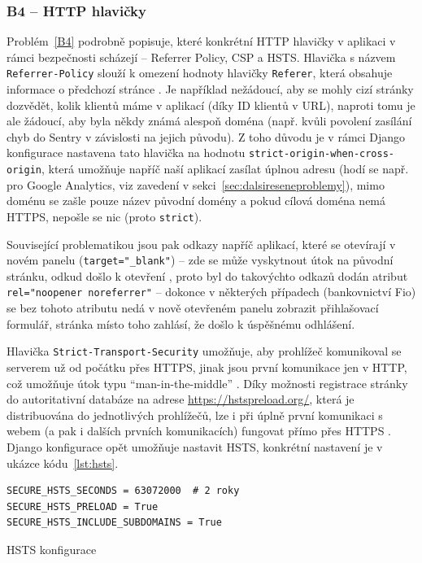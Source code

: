 \subsubsection{B4 -- HTTP hlavičky}

Problém~\ref{B4} podrobně popisuje, které konkrétní HTTP hlavičky v aplikaci v rámci bezpečnosti scházejí -- Referrer Policy, CSP a HSTS. Hlavička s názvem \verb|Referrer-Policy| slouží k omezení hodnoty hlavičky \verb|Referer|, která obsahuje informace o předchozí stránce \cite{securityheaders-referer}. Je například nežádoucí, aby se mohly cizí stránky dozvědět, kolik klientů máme v aplikací (díky ID klientů v URL), naproti tomu je ale žádoucí, aby byla někdy známá alespoň doména (např. kvůli povolení zasílání chyb do Sentry v závislosti na jejich původu). Z toho důvodu je v rámci Django konfigurace nastavena tato hlavička na hodnotu \verb|strict-origin-when-cross-origin|, která umožňuje napříč naší aplikací zasílat úplnou adresu (hodí se např. pro Google Analytics, viz zavedení v sekci~\ref{sec:dalsireseneproblemy}), mimo doménu se zašle pouze název původní domény a pokud cílová doména nemá HTTPS, nepošle se nic (proto \verb|strict|). 

Související problematikou jsou pak odkazy napříč aplikací, které se otevírají v novém panelu (\verb|target="_blank"|) -- zde se může vyskytnout útok na původní stránku, odkud došlo k otevření \cite{noopener}, proto byl do takovýchto odkazů dodán atribut \verb|rel="noopener noreferrer"| -- dokonce v některých případech (bankovnictví Fio) se bez tohoto atributu nedá v nově otevřeném panelu zobrazit přihlašovací formulář, stránka místo toho zahlásí, že došlo k úspěšnému odhlášení.

Hlavička \verb|Strict-Transport-Security| umožňuje, aby prohlížeč komunikoval se serverem už od počátku přes HTTPS, jinak jsou první komunikace jen v HTTP, což umožňuje útok typu \enquote{man-in-the-middle} \cite{securityheaders-hsts}. Díky možnosti registrace stránky do autoritativní databáze na adrese \href{https://hstspreload.org/}{https://hstspreload.org/}, která je distribuována do jednotlivých prohlížečů, lze i při úplně první komunikaci s webem (a pak i dalších prvních komunikacích) fungovat přímo přes HTTPS \cite{jakpsatweb-hsts}. Django konfigurace opět umožňuje nastavit HSTS, konkrétní nastavení je v ukázce kódu~\ref{lst:hsts}.

\begin{listing}[ht]
	\begin{verbatim}
SECURE_HSTS_SECONDS = 63072000  # 2 roky
SECURE_HSTS_PRELOAD = True
SECURE_HSTS_INCLUDE_SUBDOMAINS = True
	\end{verbatim}
	\caption{HSTS konfigurace}\label{lst:hsts}
\end{listing}

